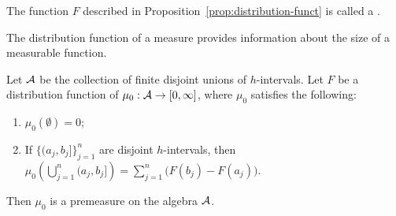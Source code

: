     \begin{definition}
        The function $F$ described in Proposition~\ref{prop:distribution-funct} is called a .
    \end{definition}

    The distribution function of a measure provides information about the size of a measurable function. 

    \begin{proposition}\label{prop:premeasures-well-defined}
        Let $\mathcal{A}$ be the collection of finite disjoint unions of $h$-intervals. Let $F$ be a distribution function of $\mu_0:\mathcal{A} \rightarrow [0,\infty]$, where $\mu_0$ satisfies the following:
            \begin{enumerate}[label = (\arabic*),itemsep=1pt,topsep=3pt]
                \item $\mu_0(\emptyset) = 0$;
                \item If $\{(a_j,b_j]\}_{j = 1}^n$ are disjoint $h$-intervals, then $\mu_0 \left( \bigcup_{j = 1}^n (a_j,b_j] \right) = \sum_{j = 1}^n \bigl(F(b_j) - F(a_j)\bigr)$.
            \end{enumerate}
        Then $\mu_0$ is a premeasure on the algebra $\mathcal{A}$.
    \end{proposition}
